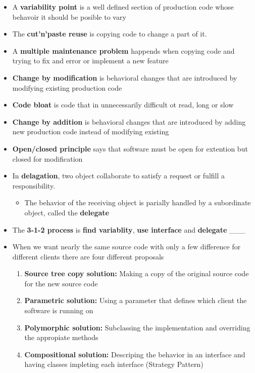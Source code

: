 \documentclass[11pt]{article}
\providecommand{\tightlist}{%
      \setlength{\itemsep}{0pt}\setlength{\parskip}{0pt}}
\begin{document}
\begin{itemize}
\item
  A \textbf{variability point} is a well defined section of production
  code whose behavoir it should be posible to vary
\item
  The \textbf{cut'n'paste reuse} is copying code to change a part of it.
\item
  A \textbf{multiple maintenance problem} happends when copying code and
  trying to fix and error or implement a new feature
\item
  \textbf{Change by modification} is behavioral changes that are
  introduced by modifying existing production code
\item
  \textbf{Code bloat} is code that in unnecessarily difficult ot read,
  long or slow
\item
  \textbf{Change by addition} is behavioral changes that are introduced
  by adding new production code instead of modifying existing
\item
  \textbf{Open/closed principle} says that software must be open for
  extention but closed for modification
\item
  In \textbf{delagation}, two object collaborate to satisfy a request or
  fulfill a responsibility.

  \begin{itemize}
  \tightlist
  \item
    The behavior of the receiving object is parially handled by a
    subordinate object, called the \textbf{delegate}
  \end{itemize}
\item
  The \textbf{3-1-2 process} is \textbf{find variablity}, \textbf{use
  interface} and \textbf{delegate} \_\_\_
\item
  When we want nearly the same source code with only a few difference
  for different clients there are four different proposals

  \begin{enumerate}
  \def\labelenumi{\arabic{enumi}.}
  \tightlist
  \item
    \textbf{Source tree copy solution:} Making a copy of the original
    source code for the new source code
  \item
    \textbf{Parametric solution:} Using a parameter that defines which
    client the software is running on
  \item
    \textbf{Polymorphic solution:} Subclassing the implementation and
    overriding the appropiate methods
  \item
    \textbf{Compositional solution:} Descriping the behavior in an
    interface and having classes impleting each interface (Strategy
    Pattern)
  \end{enumerate}
\end{itemize}
\end{document}
